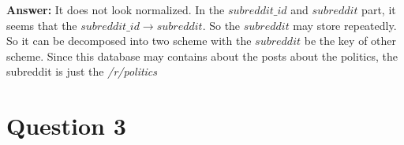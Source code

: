 \documentclass[12pt]{article}
\begin{document}
\textbf{Answer:} It does not look normalized. In the $subreddit\_id$ and $subreddit$ part, it seems that the  $subreddit\_id \to subreddit$. So the $subreddit$ may store repeatedly. So it can be decomposed into two scheme with the $subreddit$ be the key of other scheme. Since this database may contains about the posts about the politics, the subreddit is just the \textit{/r/politics}


\section {Question 3}
 
\end{document}
